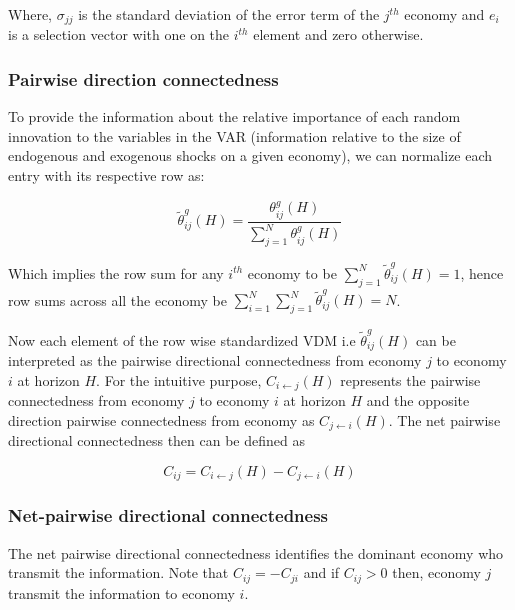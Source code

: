 \documentclass[]{elsarticle} %
\begin{document}
Where, \({{\sigma }_{jj}}\) is the standard deviation of the error term
of the \({{j}^{th}}\) economy and \({{e}_{i}}\) is a selection vector
with one on the \({{i}^{th}}\) element and zero otherwise.

\subsubsection{\texorpdfstring{\textbf{Pairwise direction
connectedness}}{Pairwise direction connectedness}}\label{pairwise-direction-connectedness}

To provide the information about the relative importance of each random
innovation to the variables in the VAR (information relative to the size
of endogenous and exogenous shocks on a given economy), we can normalize
each entry with its respective row as:

\[\tilde{\theta }_{ij}^{g}\left( H \right)=\frac{\theta _{ij}^{g}\left( H \right)}{\sum\nolimits_{j=1}^{N}{\theta _{ij}^{g}\left( H \right)}}\]

Which implies the row sum for any \({{i}^{th}}\) economy to be
\(\sum\nolimits_{j=1}^{N}{\tilde{\theta }_{ij}^{g}\left( H \right)}=1\),
hence row sums across all the economy be
\(\sum\nolimits_{i=1}^{N}{\sum\nolimits_{j=1}^{N}{\tilde{\theta }_{ij}^{g}\left( H \right)}}=N\).

Now each element of the row wise standardized VDM i.e
\({\tilde \theta _{ij}^g\left( H \right)}\) can be interpreted as the
pairwise directional connectedness from economy \(j\) to economy \(i\)
at horizon \(H\). For the intuitive purpose,
\({{C}_{i\leftarrow j}}\left( H \right)\) represents the pairwise
connectedness from economy \(j\) to economy \(i\) at horizon \(H\) and
the opposite direction pairwise connectedness from economy as
\({{C}_{j\leftarrow i}}\left( H \right)\). The net pairwise directional
connectedness then can be defined as

\[{{C}_{ij}}={{C}_{i\leftarrow j}}\left( H \right)-{{C}_{j\leftarrow i}}\left( H \right)\]

\subsubsection{\texorpdfstring{\textbf{Net-pairwise directional
connectedness}}{Net-pairwise directional connectedness}}\label{net-pairwise-directional-connectedness}

The net pairwise directional connectedness identifies the dominant
economy who transmit the information. Note that
\({{C}_{ij}}=-{{C}_{ji}}\) and if \({{C}_{ij}}>0\) then, economy
\(j\)transmit the information to economy \(i\).
\end{document}
